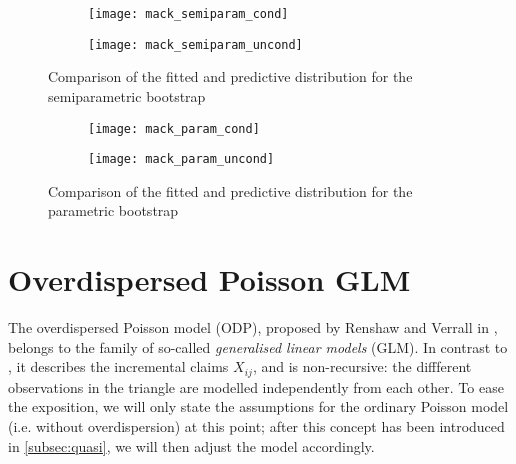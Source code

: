 \documentclass[a4paper]{book}
\begin{document}
\begin{figure}[!htb]
  \begin{subfigure}{0.45 \textwidth}
    \texttt{[image: mack\_semiparam\_cond]}
  \end{subfigure}
  \begin{subfigure}{0.45 \textwidth}
    \texttt{[image: mack\_semiparam\_uncond]}
  \end{subfigure}
  \caption{Comparison of the fitted and predictive distribution for the semiparametric bootstrap}
  \label{fig:fit-pred-semiparam}
\end{figure}

\restoregeometry

\begin{landscape}
  \begin{figure}
    \begin{subfigure}{\linewidth}
      \texttt{[image: mack\_param\_cond]}
    \end{subfigure}
    \begin{subfigure}{\linewidth}
      \texttt{[image: mack\_param\_uncond]}
    \end{subfigure}
    \caption{Comparison of the fitted and predictive distribution for the parametric bootstrap}
    \label{fig:fit-pred-param}
  \end{figure}
\end{landscape}

\chapter{Overdispersed Poisson GLM} \label{chapter:poisson}

The overdispersed Poisson model (ODP), proposed by Renshaw and Verrall in \cite{renshaw}, belongs to the family of so-called \emph{generalised linear models} (GLM). In contrast to , it describes the incremental claims $X_{ij}$, and is non-recursive: the diffferent observations in the triangle are modelled independently from each other. To ease the exposition, we will only state the assumptions for the ordinary Poisson model (i.e. without overdispersion) at this point; after this concept has been introduced in \cref{subsec:quasi}, we will then adjust the model accordingly.
\end{document}
